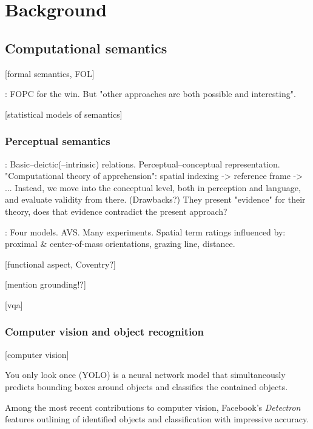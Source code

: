 \documentclass[11pt, a4paper]{article}
\begin{document}
\glsresetall
\section{Background}
\label{sec:background}

\subsection{Computational semantics}

[formal semantics, FOL]

\cite{BlackburnComputationalsemantics2003}:
FOPC for the win. But "other approaches are both possible and interesting".

[statistical models of semantics]



\subsubsection{Perceptual semantics}

\cite{LoganComputationalAnalysisApprehension1996}:
Basic–deictic(–intrinsic) relations.
Perceptual–conceptual representation.
"Computational theory of apprehension": spatial indexing -> reference frame -> ... Instead, we move into the conceptual level, both in perception and language, and evaluate validity from there.
(Drawbacks?)
They present "evidence" for their theory, does that evidence contradict the present approach?

\cite{RegierGroundingspatiallanguage2001a}:
Four models. AVS.
Many experiments.
Spatial term ratings influenced by: proximal \& center-of-mass orientations, grazing line, distance.

[functional aspect, Coventry?]

[mention grounding!?]

[vqa]



\subsubsection{Computer vision and object recognition}

[computer vision]

You only look once (YOLO) \citep{RedmonYouOnlyLook2015} is a neural network model that simultaneously predicts bounding boxes around objects and classifies the contained objects.

Among the most recent contributions to computer vision, Facebook's \textit{Detectron} \citep{Detectron2018} features outlining of identified objects and classification with impressive accuracy.
\end{document}

